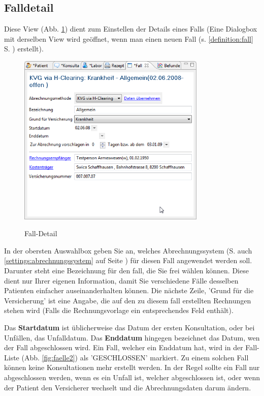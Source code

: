 \subsection{Falldetail}
\label{falldetail}
Diese View (Abb. \ref{fig:falldetail}) dient zum Einstellen der Details eines Falls (Eine Dialogbox mit derselben View wird geöffnet, wenn man einen neuen Fall (s. \ref{definition:fall} S. \pageref{definition:fall}) erstellt).
\begin{figure}[ht]
  \includegraphics[width=0.8\textwidth]{images/falldetail}\\
  \caption{Fall-Detail}\label{fig:falldetail}
\end{figure}
In der obersten Auswahlbox geben Sie an, welches Abrechnungssystem (S. auch \ref{settings:abrechnungssystem} auf Seite \pageref{settings:abrechnungssystem}) für diesen Fall angewendet werden soll. Darunter steht eine Bezeichnung für den fall, die Sie frei wählen können. Diese dient nur Ihrer eigenen Information, damit Sie verschiedene Fälle desselben Patienten einfacher auseinanderhalten können. Die nächste Zeile, 'Grund für die Versicherung' ist eine Angabe, die auf den zu diesem fall erstellten Rechnungen stehen wird (Falls die Rechnungsvorlage ein entsprechendes Feld enthält).

Das \textbf{Startdatum} ist üblicherweise das Datum der ersten Konsultation, oder bei Unfällen, das Unfalldatum. Das \textbf{Enddatum} hingegen bezeichnet das Datum, wen der Fall abgeschlossen wird. Ein Fall, welcher ein Enddatum hat, wird in der Fall-Liste (Abb. \ref{fig:faelle2}) als 'GESCHLOSSEN' markiert. Zu einem solchen Fall können keine Konsultationen mehr erstellt werden.
In der Regel sollte ein Fall nur abgeschlossen werden, wenn es ein Unfall ist, welcher abgeschlossen ist, oder wenn der Patient den Versicherer wechselt und die Abrechnungsdaten darum ändern.

